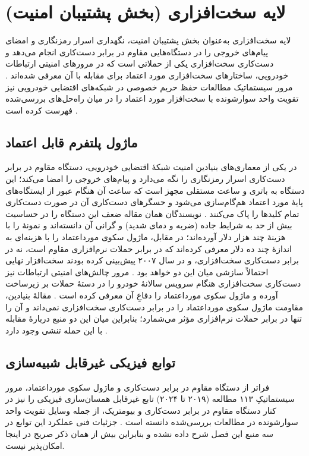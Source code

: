 \section{لایه سخت‌افزاری (بخش پشتیبان امنیت)}
لایه سخت‌افزاری به‌عنوان بخش پشتیبان امنیت، نگهداری اسرار رمزنگاری و امضای پیام‌های خروجی را در دستگاه‌هایی مقاوم در برابر دست‌کاری انجام می‌دهد و دست‌کاری سخت‌افزاری یکی از حملاتی است که در مرورهای امنیتی ارتباطات خودرویی، ساختارهای سخت‌افزاری مورد اعتماد برای مقابله با آن معرفی شده‌اند \cite{SecuringVehicularAd, farsimadanReviewSecurityChallenges2025}. مرور سیستماتیک مطالعات حفظ حریم خصوصی در شبکه‌های اقتضایی خودرویی نیز تقویت واحد سوارشونده با سخت‌افزار مورد اعتماد را در میان راه‌حل‌های بررسی‌شده فهرست کرده است \cite{rahmawatiagustinaSystematicLiteratureReview2025}.

\subsection{ماژول پلتفرم قابل اعتماد}
در یکی از معماری‌های بنیادین امنیت شبکهٔ اقتضایی خودرویی، دستگاه مقاوم در برابر دست‌کاری اسرار رمزنگاری را نگه می‌دارد و پیام‌های خروجی را امضا می‌کند؛ این دستگاه به باتری و ساعت مستقلی مجهز است که ساعت آن هنگام عبور از ایستگاه‌های پایهٔ مورد اعتماد هم‌گام‌سازی می‌شود و حسگرهای دست‌کاری آن در صورت دست‌کاری تمام کلیدها را پاک می‌کنند \cite{SecuringVehicularAd}. نویسندگان همان مقاله ضعف این دستگاه را در حساسیت بیش از حد به شرایط جاده (ضربه و دمای شدید) و گرانی آن دانسته‌اند و نمونهٔ  را با هزینهٔ چند هزار دلار آورده‌اند؛ در مقابل، ماژول سکوی مورداعتماد را با هزینه‌ای به اندازهٔ چند ده دلار معرفی کرده‌اند که در برابر حملات نرم‌افزاری مقاوم است، نه در برابر دست‌کاری سخت‌افزاری، و در سال ۲۰۰۷ پیش‌بینی کرده بودند سخت‌افزار نهایی احتمالاً سازشی میان این دو خواهد بود \cite{SecuringVehicularAd}. مرور چالش‌های امنیتی ارتباطات  نیز دست‌کاری سخت‌افزاری هنگام سرویس سالانهٔ خودرو را در دستهٔ حملات بر زیرساخت آورده و ماژول سکوی مورداعتماد را دفاعِ آن معرفی کرده است \cite{farsimadanReviewSecurityChallenges2025}. مقالهٔ بنیادین، مقاومت ماژول سکوی مورداعتماد را در برابر دست‌کاری سخت‌افزاری نمی‌داند و آن را تنها در برابر حملات نرم‌افزاری مؤثر می‌شمارد؛ بنابراین میان این دو منبع دربارهٔ مقابله با این حمله تنشی وجود دارد \cite{SecuringVehicularAd}.

\subsection{توابع فیزیکی غیرقابل شبیه‌سازی}
فراتر از دستگاه مقاوم در برابر دست‌کاری و ماژول سکوی مورداعتماد، مرور سیستماتیکِ ۱۱۳ مطالعه (۲۰۱۹ تا ۲۰۲۴) تابع غیرقابل همسان‌سازی فیزیکی را نیز در کنار دستگاه مقاوم در برابر دست‌کاری و بیومتریک، از جمله وسایل تقویت واحد سوارشونده در مطالعات بررسی‌شده دانسته است \cite{rahmawatiagustinaSystematicLiteratureReview2025}. جزئیات فنی عملکرد این توابع در سه منبع این فصل شرح داده نشده و بنابراین بیش از همان ذکر صریح در اینجا امکان‌پذیر نیست.

